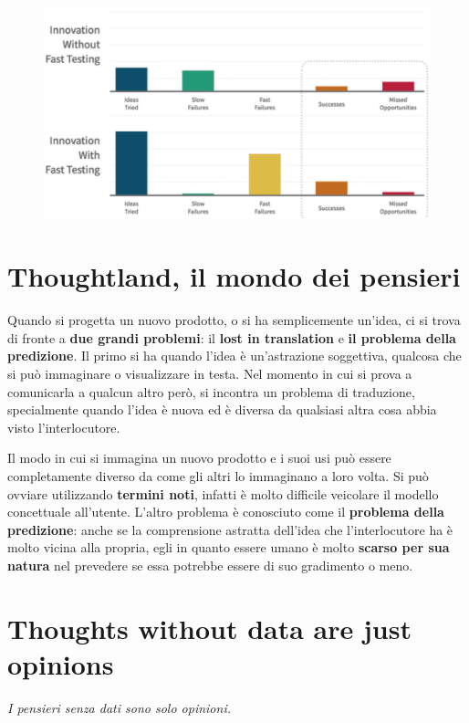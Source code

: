 \pagebreak

\begin{figure}[!h]
	\centering
	\includegraphics[scale=0.25]{immagini/innovation-fast-testing.png}
\end{figure}

\section{Thoughtland, il mondo dei pensieri}
Quando si progetta un nuovo prodotto, o si ha semplicemente un'idea, ci si trova di fronte a \textbf{due grandi problemi}: il \textbf{lost in translation}
e \textbf{il problema della predizione}. Il primo si ha quando l'idea è un'astrazione soggettiva, qualcosa che si può immaginare o visualizzare in testa.
Nel momento in cui si prova a comunicarla a qualcun altro però, si incontra un problema di traduzione, specialmente quando l'idea è nuova ed è diversa da
qualsiasi altra cosa abbia visto l'interlocutore.

Il modo in cui si immagina un nuovo prodotto e i suoi usi può essere completamente diverso da come gli altri lo immaginano a loro volta. Si può ovviare
utilizzando \textbf{termini noti}, infatti è molto difficile veicolare il modello concettuale all'utente. L'altro problema è conosciuto come il
\textbf{problema della predizione}: anche se la comprensione astratta dell'idea che l'interlocutore ha è molto vicina alla propria, egli in quanto essere
umano è molto \textbf{scarso per sua natura} nel prevedere se essa potrebbe essere di suo gradimento o meno.

\section{Thoughts without data are just opinions}
\begin{flushleft}
	\textit{I pensieri senza dati sono solo opinioni.}
\end{flushleft}

